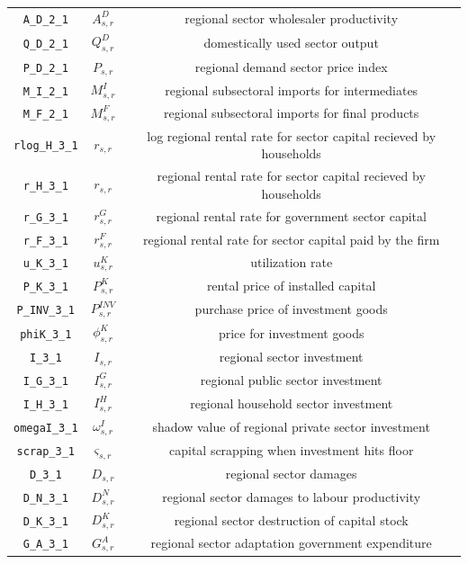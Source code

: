 \begin{center}
\begin{longtable}{ccc}
\texttt{A\_D\_2\_1} & ${A^{D}_{s,r}}$ & regional sector wholesaler productivity\\
\texttt{Q\_D\_2\_1} & ${Q^{D}_{s,r}}$ & domestically used sector output\\
\texttt{P\_D\_2\_1} & ${P_{s,r}}$ & regional demand sector price index\\
\texttt{M\_I\_2\_1} & ${M^I_{s,r}}$ & regional subsectoral imports for intermediates\\
\texttt{M\_F\_2\_1} & ${M^F_{s,r}}$ & regional subsectoral imports for final products\\
\texttt{rlog\_H\_3\_1} & ${r_{s,r}}$ & log regional rental rate for sector capital recieved by households\\
\texttt{r\_H\_3\_1} & ${r_{s,r}}$ & regional rental rate for sector capital recieved by households\\
\texttt{r\_G\_3\_1} & ${r^G_{s,r}}$ & regional rental rate for government sector capital\\
\texttt{r\_F\_3\_1} & ${r^F_{s,r}}$ & regional rental rate for sector capital paid by the firm\\
\texttt{u\_K\_3\_1} & ${u^K_{s,r}}$ & utilization rate\\
\texttt{P\_K\_3\_1} & ${P^K_{s,r}}$ & rental price of installed capital\\
\texttt{P\_INV\_3\_1} & ${P^{INV}_{s,r}}$ & purchase price of investment goods\\
\texttt{phiK\_3\_1} & ${\phi^K_{s,r}}$ & price for investment goods\\
\texttt{I\_3\_1} & ${I_{s,r}}$ & regional sector investment\\
\texttt{I\_G\_3\_1} & ${I^G_{s,r}}$ & regional public sector investment\\
\texttt{I\_H\_3\_1} & ${I^H_{s,r}}$ & regional household sector investment\\
\texttt{omegaI\_3\_1} & ${\omega^I_{s,r}}$ & shadow value of regional private sector investment\\
\texttt{scrap\_3\_1} & ${\varsigma_{s,r}}$ & capital scrapping when investment hits floor\\
\texttt{D\_3\_1} & ${D_{s,r}}$ & regional sector damages\\
\texttt{D\_N\_3\_1} & ${D^N_{s,r}}$ & regional sector damages to labour productivity\\
\texttt{D\_K\_3\_1} & ${D^K_{s,r}}$ & regional sector destruction of capital stock\\
\texttt{G\_A\_3\_1} & ${G^{A}_{s,r}}$ & regional sector adaptation government expenditure\\

\end{longtable}
\end{center}
